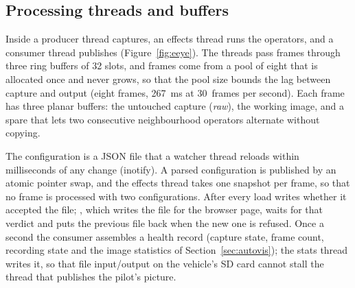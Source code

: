 \subsection{Processing threads and buffers}\label{sec:threads}

Inside \eeye{} a producer thread captures, an effects thread runs the
operators, and
a consumer thread publishes (Figure~\ref{fig:eeye}). The threads pass
frames through
three ring buffers of 32 slots, and frames come from a pool of eight
that is allocated
once and never grows, so that the pool size bounds the lag between
capture and output
(eight frames, 267~ms at 30~frames per second). Each frame has three
planar buffers:
the untouched capture (\emph{raw}), the working image, and a spare that lets two
consecutive neighbourhood operators alternate without copying.

The configuration is a JSON file that a watcher thread reloads within
milliseconds of
any change (inotify). A parsed configuration is published by an
atomic pointer swap,
and the effects thread takes one snapshot per frame, so that no frame
is processed
with two configurations. After every load \eeye{} writes whether it
accepted the file;
\hellion{}, which writes the file for the browser page, waits for
that verdict and
puts the previous file back when the new one is refused. Once a
second the consumer
assembles a health record (capture state, frame count, recording
  state and the image
statistics of Section~\ref{sec:autovis}); the stats thread writes it,
so that file
input/output on the vehicle's SD card cannot stall the thread that publishes the
pilot's picture.


